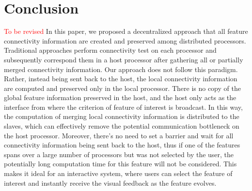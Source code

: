 \documentclass[10pt, conference, compsocconf]{IEEEtran}
\begin{document}
\section{Conclusion}
\textcolor{red}{To be revised}
In this paper, we proposed a decentralized approach that all feature connectivity information are created and preserved among distributed processors. Traditional approaches perform connectivity test on each processor and subsequently correspond them in a host processor after gathering all or partially merged connectivity information. Our approach does not follow this paradigm. Rather, %
instead being sent back to the host, the local connectivity information are computed and preserved only in the local processor. 
There is no copy of the global feature information preserved in the host, and the host only acts as the interface from where the criterion of feature of interest is broadcast. In this way, the computation of merging local connectivity information is distributed to the slaves, which can effectively remove the potential communication bottleneck on the host processor. 
Moreover, there's no need to set a barrier and wait for all connectivity information being sent back to the host, thus if one of the features spans over a large number of processors but was not selected by the user, the potentially long computation time for this feature will not be considered. This makes it ideal for an interactive system, where users can select the feature of interest and instantly receive the visual feedback as the feature evolves.





\end{document}
